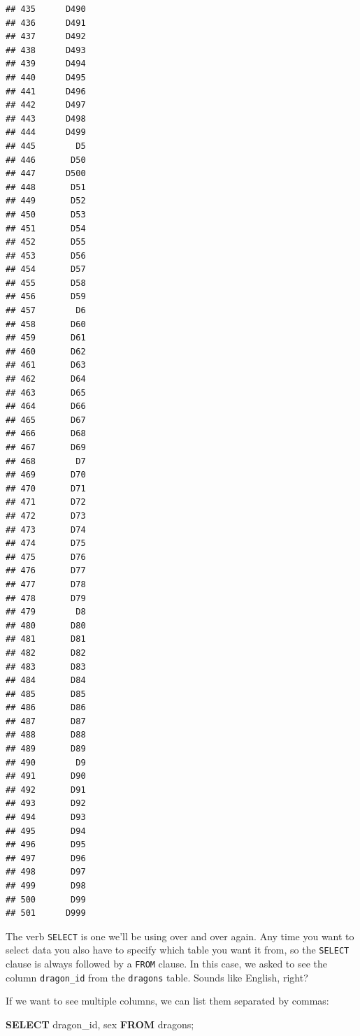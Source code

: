 \documentclass[
]{book}
\newenvironment{Shaded}{\begin{snugshade}}{\end{snugshade}}
\newcommand{\KeywordTok}[1]{\textcolor[rgb]{0.13,0.29,0.53}{\textbf{#1}}}
\newcommand{\NormalTok}[1]{#1}
\begin{document}
\begin{verbatim}
## 435      D490
## 436      D491
## 437      D492
## 438      D493
## 439      D494
## 440      D495
## 441      D496
## 442      D497
## 443      D498
## 444      D499
## 445        D5
## 446       D50
## 447      D500
## 448       D51
## 449       D52
## 450       D53
## 451       D54
## 452       D55
## 453       D56
## 454       D57
## 455       D58
## 456       D59
## 457        D6
## 458       D60
## 459       D61
## 460       D62
## 461       D63
## 462       D64
## 463       D65
## 464       D66
## 465       D67
## 466       D68
## 467       D69
## 468        D7
## 469       D70
## 470       D71
## 471       D72
## 472       D73
## 473       D74
## 474       D75
## 475       D76
## 476       D77
## 477       D78
## 478       D79
## 479        D8
## 480       D80
## 481       D81
## 482       D82
## 483       D83
## 484       D84
## 485       D85
## 486       D86
## 487       D87
## 488       D88
## 489       D89
## 490        D9
## 491       D90
## 492       D91
## 493       D92
## 494       D93
## 495       D94
## 496       D95
## 497       D96
## 498       D97
## 499       D98
## 500       D99
## 501      D999
\end{verbatim}

The verb \texttt{SELECT} is one we'll be using over and over again. Any time you want
to select data you also have to specify which table you want it from, so the
\texttt{SELECT} clause is always followed by a \texttt{FROM} clause. In this case, we asked
to see the column \texttt{dragon\_id} from the \texttt{dragons} table. Sounds like English,
right?

If we want to see multiple columns, we can list them separated by commas:

\begin{Shaded}
\begin{Highlighting}[]
\KeywordTok{SELECT}\NormalTok{ dragon\_id, sex }
\KeywordTok{FROM}\NormalTok{ dragons;}
\end{Highlighting}
\end{Shaded}
\end{document}
